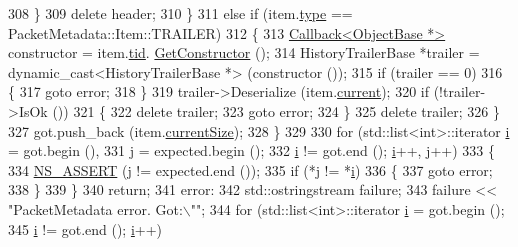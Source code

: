 \begin{DoxyCode}
308             \}
309           \textcolor{keyword}{delete} header;
310         \}
311       \textcolor{keywordflow}{else} \textcolor{keywordflow}{if} (item.\hyperlink{structns3_1_1PacketMetadata_1_1Item_a76d4fe6402891fd8d840442d51b0f6a0}{type} == PacketMetadata::Item::TRAILER)
312         \{
313           \hyperlink{classns3_1_1Callback}{Callback<ObjectBase *>} constructor = item.\hyperlink{structns3_1_1PacketMetadata_1_1Item_a07dac03d1aa1be885295bdfd113f78e7}{tid}.
      \hyperlink{classns3_1_1TypeId_ad9b0bc71ee7593a1ff23ff8d53938e95}{GetConstructor} ();
314           HistoryTrailerBase *trailer = \textcolor{keyword}{dynamic\_cast<}HistoryTrailerBase *\textcolor{keyword}{>} (constructor ());
315           \textcolor{keywordflow}{if} (trailer == 0)
316             \{
317               \textcolor{keywordflow}{goto} error;
318             \}
319           trailer->Deserialize (item.\hyperlink{structns3_1_1PacketMetadata_1_1Item_aa8c1eed1363b2965204125b91659f639}{current});
320           \textcolor{keywordflow}{if} (!trailer->IsOk ())
321             \{
322               \textcolor{keyword}{delete} trailer;
323               \textcolor{keywordflow}{goto} error;
324             \}
325           \textcolor{keyword}{delete} trailer;
326         \}
327       got.push\_back (item.\hyperlink{structns3_1_1PacketMetadata_1_1Item_afe99c84baf1db382630fab75a464fc63}{currentSize});
328     \}
329 
330   \textcolor{keywordflow}{for} (std::list<int>::iterator \hyperlink{bernuolliDistribution_8m_a6f6ccfcf58b31cb6412107d9d5281426}{i} = got.begin (),
331        j = expected.begin ();
332        \hyperlink{bernuolliDistribution_8m_a6f6ccfcf58b31cb6412107d9d5281426}{i} != got.end (); \hyperlink{bernuolliDistribution_8m_a6f6ccfcf58b31cb6412107d9d5281426}{i}++, j++)
333     \{
334       \hyperlink{assert_8h_a6dccdb0de9b252f60088ce281c49d052}{NS\_ASSERT} (j != expected.end ());
335       \textcolor{keywordflow}{if} (*j != *\hyperlink{bernuolliDistribution_8m_a6f6ccfcf58b31cb6412107d9d5281426}{i})
336         \{
337           \textcolor{keywordflow}{goto} error;
338         \}
339     \}
340   \textcolor{keywordflow}{return};
341 error:
342   std::ostringstream failure;
343   failure << \textcolor{stringliteral}{"PacketMetadata error. Got:\(\backslash\)""};
344   \textcolor{keywordflow}{for} (std::list<int>::iterator \hyperlink{bernuolliDistribution_8m_a6f6ccfcf58b31cb6412107d9d5281426}{i} = got.begin (); 
345        \hyperlink{bernuolliDistribution_8m_a6f6ccfcf58b31cb6412107d9d5281426}{i} != got.end (); \hyperlink{bernuolliDistribution_8m_a6f6ccfcf58b31cb6412107d9d5281426}{i}++)

\end{DoxyCode}
